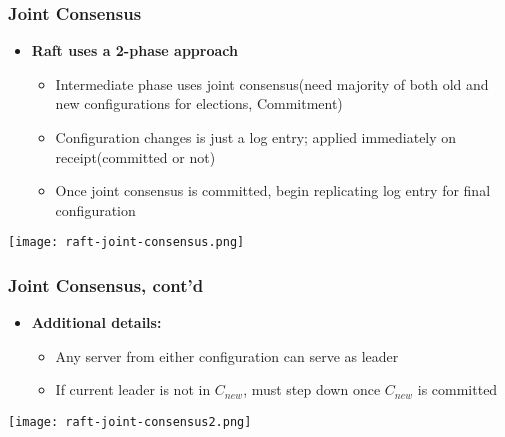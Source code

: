 \begin{frame}
    \frametitle{Joint Consensus}
    \begin{itemize}
        \item \textbf{Raft uses a 2-phase approach}
            \begin{itemize}
                \item Intermediate phase uses \alert{joint consensus}(need majority of both old and new configurations for elections, Commitment)
                \item Configuration changes is just a log entry; applied immediately on receipt(committed or not)
                \item Once joint consensus is committed, begin replicating log entry for final configuration
            \end{itemize}
    \end{itemize}
    \texttt{[image: raft-joint-consensus.png]}
\end{frame}

\begin{frame}
    \frametitle{Joint Consensus, cont'd}
    \begin{itemize}
        \item \textbf{Additional details:}
            \begin{itemize}
                \item Any server from either configuration can serve as leader
                \item If current leader is not in $C_{new}$, must step down once $C_{new}$ is committed
            \end{itemize}
    \end{itemize}
    \texttt{[image: raft-joint-consensus2.png]}
\end{frame}



